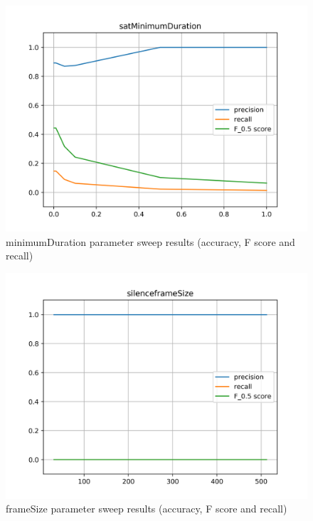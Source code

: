 \begin{figure}[!ht]
	\includegraphics[clip,width=\columnwidth]{Figures/satMinimumDuration.png}%
	\caption{minimumDuration parameter sweep results (accuracy, F score and recall)}
	\label{fig:accomp}
\end{figure}

\begin{figure}[!ht]
	\includegraphics[clip,width=\columnwidth]{Figures/silenceframeSize.png}%
	\caption{frameSize parameter sweep results (accuracy, F score and recall)}
	\label{fig:accomp}
\end{figure}

